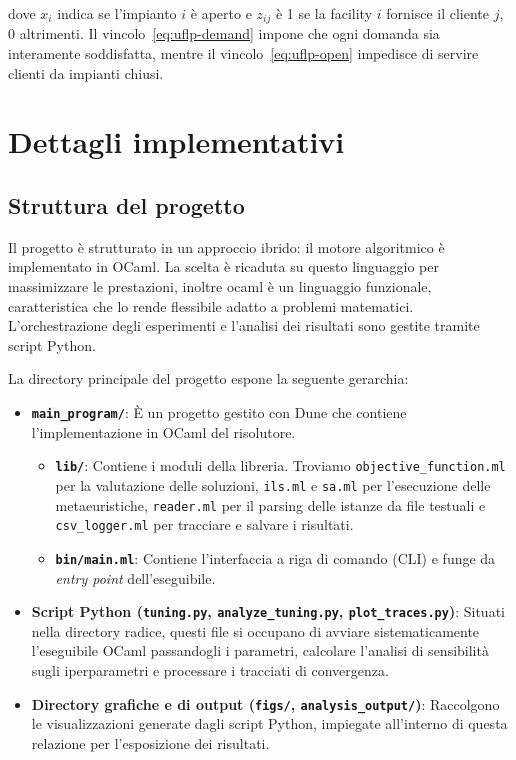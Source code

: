\documentclass[11pt,a4paper]{article}
\begin{document}
dove $x_i$ indica se l'impianto $i$ è aperto e $z_{ij}$ è 1 se la facility $i$ fornisce il cliente $j$, 0 altrimenti.
Il vincolo~\eqref{eq:uflp-demand} impone che
ogni domanda sia interamente soddisfatta, mentre il vincolo~\eqref{eq:uflp-open}
impedisce di servire clienti da impianti chiusi.

\section{Dettagli implementativi}

\subsection{Struttura del progetto}

Il progetto è strutturato in un approccio ibrido: il motore algoritmico è implementato in OCaml. La scelta è ricaduta su questo linguaggio per massimizzare le prestazioni, inoltre ocaml è un linguaggio funzionale, caratteristica che lo rende flessibile adatto a problemi matematici. L'orchestrazione degli esperimenti e l'analisi dei risultati sono gestite tramite script Python. 

La directory principale del progetto espone la seguente gerarchia:
\begin{itemize}
    \item \textbf{\texttt{main\_program/}}: È un progetto gestito con Dune che contiene l'implementazione in OCaml del risolutore.
    \begin{itemize}
        \item \textbf{\texttt{lib/}}: Contiene i moduli della libreria. Troviamo \texttt{objective\_function.ml} per la valutazione delle soluzioni, \texttt{ils.ml} e \texttt{sa.ml} per l'esecuzione delle metaeuristiche, \texttt{reader.ml} per il parsing delle istanze da file testuali e \texttt{csv\_logger.ml} per tracciare e salvare i risultati.
        \item \textbf{\texttt{bin/main.ml}}: Contiene l'interfaccia a riga di comando (CLI) e funge da \emph{entry point} dell'eseguibile.
    \end{itemize}
    \item \textbf{Script Python (\texttt{tuning.py}, \texttt{analyze\_tuning.py}, \texttt{plot\_traces.py})}: Situati nella directory radice, questi file si occupano di avviare sistematicamente l'eseguibile OCaml passandogli i parametri, calcolare l'analisi di sensibilità sugli iperparametri e processare i tracciati di convergenza.
    \item \textbf{Directory grafiche e di output (\texttt{figs/}, \texttt{analysis\_output/})}: Raccolgono le visualizzazioni generate dagli script Python, impiegate all'interno di questa relazione per l'esposizione dei risultati.
\end{itemize}
\end{document}
